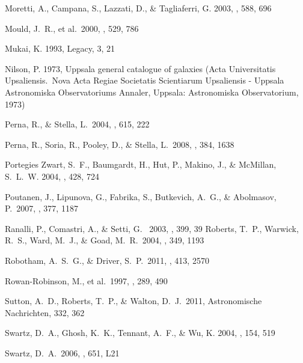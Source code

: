 \documentclass{article}
\begin{document}
\begin{thebibliography}{47}
{Moretti}, A., {Campana}, S., {Lazzati}, D., \& {Tagliaferri}, G. 2003, \apj,
  588, 696

 Mould, J.~R., et al.\ 2000, \apj, 529, 786 

 Mukai, K. 1993, Legacy, 3, 21

{Nilson}, P. 1973, {Uppsala general catalogue of galaxies} (Acta Universitatis
  Upsaliensis.~Nova Acta Regiae Societatis Scientiarum Upsaliensis - Uppsala
  Astronomiska Observatoriums Annaler, Uppsala: Astronomiska Observatorium,
  1973)

 Perna, R., \& Stella, L.\ 2004, \apj, 615, 222 

 Perna, R., Soria, R., Pooley, D., \& Stella, L.\ 2008, \mnras, 384, 1638 

{Portegies Zwart}, S.~F., {Baumgardt}, H., {Hut}, P., {Makino}, J., \&
  {McMillan}, S.~L.~W. 2004, \nat, 428, 724

 Poutanen, J., Lipunova, G., Fabrika, S., Butkevich, A.~G., 
 \& Abolmasov, P.\ 2007, \mnras, 377, 1187 

\bibitem[Ranalli et al. 2003]{}
 Ranalli, P., Comastri, A., \& Setti, G. \ 2003, \aap, 399, 39
 Roberts, T.~P., Warwick, R.~S., Ward, M.~J., \& Goad, M.~R.\ 2004, \mnras, 349, 1193 

 Robotham, A.~S.~G., \& Driver, S.~P.\ 2011, \mnras, 413, 2570 

 Rowan-Robinson, M., et al.\ 1997, \mnras, 289, 490 

 Sutton, A.~D., Roberts, T.~P., \& Walton, D.~J.\ 2011, Astronomische Nachrichten, 332, 362 

{Swartz}, D.~A., {Ghosh}, K.~K., {Tennant}, A.~F., \& {Wu}, K. 2004, \apjs,
  154, 519

 Swartz, D.~A.\ 2006, \apjl, 651, L21 


\end{thebibliography}
\end{document}
